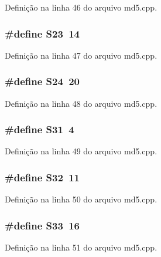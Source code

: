Definição na linha 46 do arquivo md5.\+cpp.

\subsubsection[{S23}]{\setlength{\rightskip}{0pt plus 5cm}\#define S23~14}\label{md5_8cpp_a6321a8b29628936f76e9e78cf5bda95f}


Definição na linha 47 do arquivo md5.\+cpp.

\subsubsection[{S24}]{\setlength{\rightskip}{0pt plus 5cm}\#define S24~20}\label{md5_8cpp_a0c09eb77d30a0d5f9154914147b86c20}


Definição na linha 48 do arquivo md5.\+cpp.

\subsubsection[{S31}]{\setlength{\rightskip}{0pt plus 5cm}\#define S31~4}\label{md5_8cpp_aef26590f8a880ee6f4a158168defcd89}


Definição na linha 49 do arquivo md5.\+cpp.

\subsubsection[{S32}]{\setlength{\rightskip}{0pt plus 5cm}\#define S32~11}\label{md5_8cpp_a1d512424dd8a91e0a5bcc98563f33914}


Definição na linha 50 do arquivo md5.\+cpp.

\subsubsection[{S33}]{\setlength{\rightskip}{0pt plus 5cm}\#define S33~16}\label{md5_8cpp_a1c854214533f6220e859b0063196abb3}


Definição na linha 51 do arquivo md5.\+cpp.

